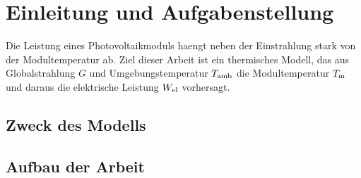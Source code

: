 \section{Einleitung und Aufgabenstellung}
\label{sec:einleitung}


Die Leistung eines Photovoltaikmoduls haengt neben der Einstrahlung stark von
der Modultemperatur ab. Ziel dieser Arbeit ist ein thermisches Modell, das aus
Globalstrahlung $G$ und Umgebungstemperatur $T_\mathrm{amb}$ die Modultemperatur $T_\mathrm{m}$
und daraus die elektrische Leistung $W_\mathrm{el}$ vorhersagt.

\subsection{Zweck des Modells}

\subsection{Aufbau der Arbeit}

